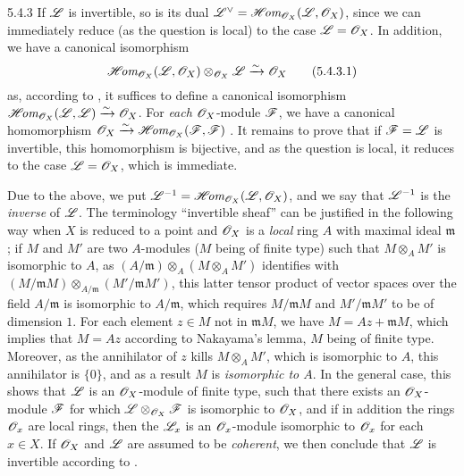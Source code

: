 \begin{env}{5.4.3}
\label{env-0.5.4.3}
If $\mathscr{L}$ is invertible, so is its dual
${\mathscr{L}}^\vee=\mathscr{H}\!\textit{om}_{\mathscr{O}_X}(\mathscr{L},\mathscr{O}_X)$, since we can immediately reduce
(as the question is local) to the case $\mathscr{L}=\mathscr{O}_X$. In addition, we have a
canonical isomorphism
\[
  \mathscr{H}\!\textit{om}_{\mathscr{O}_X}(\mathscr{L},\mathscr{O}_X)\otimes_{\mathscr{O}_X}\mathscr{L}\xrightarrow{\sim}\mathscr{O}_X
  \tag{5.4.3.1}
\]
as, according to , it suffices to define a canonical
isomorphism $\mathscr{H}\!\textit{om}_{\mathscr{O}_X}(\mathscr{L},\mathscr{L})\xrightarrow{\sim}\mathscr{O}_X$. For \emph{each}
$\mathscr{O}_X$-module $\mathscr{F}$, we have a canonical homomorphism
$\mathscr{O}_X\xrightarrow{\sim}\mathscr{H}\!\textit{om}_{\mathscr{O}_X}(\mathscr{F},\mathscr{F})$ . It remains to
prove that if $\mathscr{F}=\mathscr{L}$ is invertible, this homomorphism is bijective, and
as the question is local, it reduces to the case $\mathscr{L}=\mathscr{O}_X$, which is
immediate.

Due to the above, we put $\mathscr{L}^{-1}=\mathscr{H}\!\textit{om}_{\mathscr{O}_X}(\mathscr{L},\mathscr{O}_X)$, and we say
that $\mathscr{L}^{-1}$ is the \emph{inverse} of $\mathscr{L}$. The terminology
``invertible sheaf'' can be justified in the following way when $X$ is reduced
to a point and $\mathscr{O}_X$ is a \emph{local} ring $A$ with maximal ideal
$\mathfrak{m}$; if $M$ and $M'$ are two $A$-modules ($M$ being of finite type)
such that $M\otimes_A M'$ is isomorphic to $A$, as
$(A/\mathfrak{m})\otimes_A(M\otimes_A M')$ identifies with
$(M/\mathfrak{m}M)\otimes_{A/\mathfrak{m}}(M'/\mathfrak{m}M')$, this latter
tensor product of vector spaces over the field $A/\mathfrak{m}$ is isomorphic to
$A/\mathfrak{m}$, which requires $M/\mathfrak{m}M$ and $M'/\mathfrak{m}M'$ to be
of dimension $1$. For each element $z\in M$ not in $\mathfrak{m}M$, we have
$M=Az+\mathfrak{m}M$, which implies that $M=Az$ according to Nakayama's lemma,
$M$ being of finite type. Moreover, as the annihilator of $z$ kills
$M\otimes_A M'$, which is isomorphic to $A$, this annihilator is $\{0\}$, and
as a result $M$ is \emph{isomorphic to $A$}. In the general case, this shows
that $\mathscr{L}$ is an $\mathscr{O}_X$-module of finite type, such that there exists an
$\mathscr{O}_X$-module $\mathscr{F}$ for which $\mathscr{L}\otimes_{\mathscr{O}_X}\mathscr{F}$ is isomorphic to
$\mathscr{O}_X$, and if in addition the rings $\mathscr{O}_x$ are local rings, then the
$\mathscr{L}_x$ is an $\mathscr{O}_x$-module isomorphic to $\mathscr{O}_x$ for each $x\in X$. If
$\mathscr{O}_X$ and $\mathscr{L}$ are assumed to be \emph{coherent}, we then conclude that
$\mathscr{L}$ is invertible according to .
\end{env}

